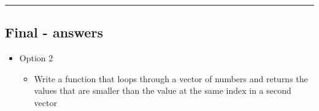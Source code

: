 \documentclass[]{article}
\newenvironment{Shaded}{\begin{snugshade}}{\end{snugshade}}
\newcommand{\ControlFlowTok}[1]{\textcolor[rgb]{0.13,0.29,0.53}{\textbf{#1}}}
\newcommand{\DataTypeTok}[1]{\textcolor[rgb]{0.13,0.29,0.53}{#1}}
\newcommand{\DecValTok}[1]{\textcolor[rgb]{0.00,0.00,0.81}{#1}}
\newcommand{\KeywordTok}[1]{\textcolor[rgb]{0.13,0.29,0.53}{\textbf{#1}}}
\newcommand{\NormalTok}[1]{#1}
\newcommand{\OperatorTok}[1]{\textcolor[rgb]{0.81,0.36,0.00}{\textbf{#1}}}
\newcommand{\StringTok}[1]{\textcolor[rgb]{0.31,0.60,0.02}{#1}}
\providecommand{\tightlist}{%
  \setlength{\itemsep}{0pt}\setlength{\parskip}{0pt}}
\begin{document}
\begin{Shaded}
\end{Shaded}

\begin{center}\rule{0.5\linewidth}{\linethickness}\end{center}

\hypertarget{final---answers-1}{%
\subsection{Final - answers}\label{final---answers-1}}

\begin{itemize}
\tightlist
\item
  Option 2

  \begin{itemize}
  \tightlist
  \item
    Write a function that loops through a vector of numbers and returns
    the values that are smaller than the value at the same index in a
    second vector
  \end{itemize}
\end{itemize}
\end{document}
